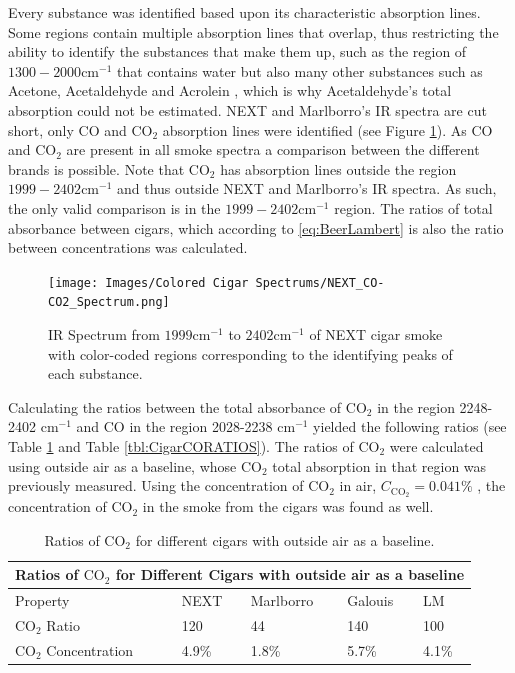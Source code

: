 \documentclass[reprint,amsmath,amssymb,aps, prl]{revtex4-2}
\begin{document}
Every substance was identified based upon its characteristic absorption lines\cite{NISTwebook}\cite{IRCEllSMOKE}. 
Some regions contain multiple absorption lines that overlap, thus restricting the ability to identify the substances that make them up, such as the region of $1300-2000\text{cm}^{-1}$ that contains water but also many other substances such as Acetone, Acetaldehyde and Acrolein \cite{FTIRSPECTRAOFSMOKE}, which is why Acetaldehyde's total absorption could not be estimated. 
NEXT and Marlborro's IR spectra are cut short, only CO and $\text{CO}_{2}$ absorption lines were identified (see Figure \ref{fig:COCO2NEXT}).
As CO and $\text{CO}_{2}$ are present in all smoke spectra a comparison between the different brands is possible. Note that $\text{CO}_{2}$ has absorption lines outside the region $1999-2402 \text{cm}^{-1}$ and thus outside NEXT and Marlborro's IR spectra. As such, the only valid comparison is in the $1999-2402 \text{cm}^{-1}$ region. The ratios of total absorbance between cigars, which according to \ref{eq:BeerLambert} is also the ratio between concentrations was calculated.

\begin{figure}
    \texttt{[image: Images/Colored Cigar Spectrums/NEXT\_CO-CO2\_Spectrum.png]} 
    \caption{IR Spectrum from $1999 \text{cm}^{-1}$ to $2402 \text{cm}^{-1}$ of NEXT cigar smoke with color-coded regions corresponding to the identifying peaks of each substance.}
    \label{fig:COCO2NEXT}
\end{figure}

Calculating the ratios between the total absorbance of $\text{CO}_{2}$ in the region 2248-2402 $\text{cm}^{-1}$ and CO in the region 2028-2238 $\text{cm}^{-1}$ yielded the following ratios (see Table \ref{tbl:CigarCO2RATIOS} and Table \ref{tbl:CigarCORATIOS}). The ratios of $\text{CO}_{2}$ were calculated using outside air as a baseline, whose $\text{CO}_{2}$ total absorption in that region was previously measured. Using the concentration of $\text{CO}_{2}$ in air, $C_{\text{CO}_{2}}=0.041\%$ \cite{NASA}, the concentration of $\text{CO}_{2}$ in the smoke from the cigars was found as well. 

\begin{table}[h]
    \begin{tabular}{ |p{1.9cm}|p{1.5cm}|p{1.5cm}|p{1.5cm}|p{1.5cm}|  }
     \hline
     \multicolumn{5}{|c|}{Ratios of $\text{CO}_{2}$ for Different Cigars with outside air as a baseline} \\ \hline
     Property & NEXT & Marlborro & Galouis & LM\\ \hline
     $\text{CO}_{2}$ Ratio & 120 & 44 & 140 & 100 \\ \hline
     $\text{CO}_{2}$ Concentration &4.9\% & 1.8\%& 5.7\% & 4.1\% \\\hline
    
    \end{tabular}
    \caption{Ratios of $\text{CO}_{2}$ for different cigars with outside air as a baseline.}
    \label{tbl:CigarCO2RATIOS}
\end{table}
\end{document}
